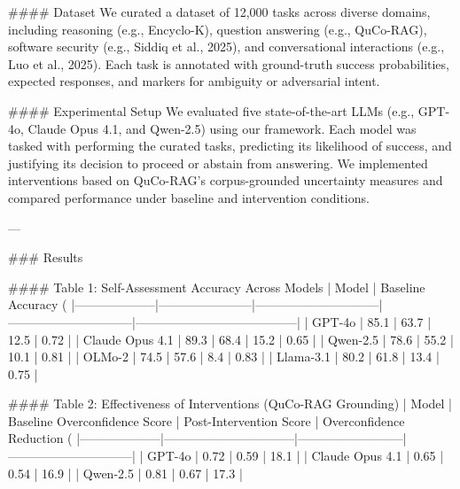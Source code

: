 #### Dataset  
We curated a dataset of 12,000 tasks across diverse domains, including reasoning (e.g., Encyclo-K), question answering (e.g., QuCo-RAG), software security (e.g., Siddiq et al., 2025), and conversational interactions (e.g., Luo et al., 2025). Each task is annotated with ground-truth success probabilities, expected responses, and markers for ambiguity or adversarial intent.

#### Experimental Setup  
We evaluated five state-of-the-art LLMs (e.g., GPT-4o, Claude Opus 4.1, and Qwen-2.5) using our framework. Each model was tasked with performing the curated tasks, predicting its likelihood of success, and justifying its decision to proceed or abstain from answering. We implemented interventions based on QuCo-RAG's corpus-grounded uncertainty measures and compared performance under baseline and intervention conditions.

---

### Results  

#### Table 1: Self-Assessment Accuracy Across Models  
| Model              | Baseline Accuracy (%
|--------------------|-----------------------|------------------------------|------------------------------|---------------------------------------|
| GPT-4o             | 85.1                 | 63.7                         | 12.5                         | 0.72                                  |
| Claude Opus 4.1    | 89.3                 | 68.4                         | 15.2                         | 0.65                                  |
| Qwen-2.5           | 78.6                 | 55.2                         | 10.1                         | 0.81                                  |
| OLMo-2             | 74.5                 | 57.6                         | 8.4                          | 0.83                                  |
| Llama-3.1          | 80.2                 | 61.8                         | 13.4                         | 0.75                                  |

#### Table 2: Effectiveness of Interventions (QuCo-RAG Grounding)  
| Model              | Baseline Overconfidence Score | Post-Intervention Score | Overconfidence Reduction (%
|--------------------|--------------------------------|--------------------------|------------------------------|
| GPT-4o             | 0.72                           | 0.59                     | 18.1                         |
| Claude Opus 4.1    | 0.65                           | 0.54                     | 16.9                         |
| Qwen-2.5           | 0.81                           | 0.67                     | 17.3                         |

